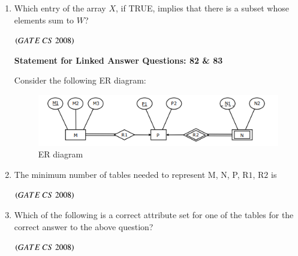 \documentclass[journal]{IEEEtran}
\numberwithin{equation}{enumi}
\numberwithin{figure}{enumi}
\begin{document}
\begin{enumerate}
\item Which entry of the array $X$, if TRUE, implies that there is a subset whose elements sum to $W$? 
\begin{enumerate} 
\end{enumerate}
\hfill $\left(GATE\ CS\  2008\right)$

\begin{center}
\textbf{Statement for Linked Answer Questions: 82 \& 83}
\end{center}
Consider the following ER diagram:
\begin{figure}[H]
    \centering
    \includegraphics[width=0.5\columnwidth]{figs/fig8.png}
    \caption{ER diagram}
    \label{fig:8}
   \end{figure}

\item The minimum number of tables needed to represent M, N, P, R$1$, R$2$ is  
\begin{enumerate}
\end{enumerate}
\hfill $\left(GATE\ CS\  2008\right)$

\item Which of the following is a correct attribute set for one of the tables for the correct answer to the above question?  
 \begin{enumerate}
\end{enumerate}
\hfill $\left(GATE\ CS\  2008\right)$


\end{enumerate}
\end{document}
